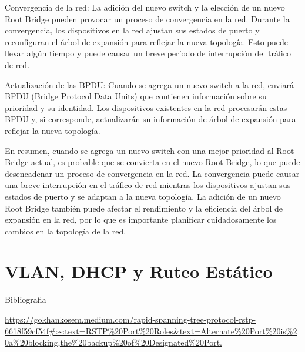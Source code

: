 \documentclass[a4paper]{article}
\begin{document}
\begin{enumerate}
Convergencia de la red: La adición del nuevo switch y la elección de un nuevo Root Bridge pueden provocar un proceso de convergencia en la red. Durante la convergencia, los dispositivos en la red ajustan sus estados de puerto y reconfiguran el árbol de expansión para reflejar la nueva topología. Esto puede llevar algún tiempo y puede causar un breve período de interrupción del tráfico de red.

Actualización de las BPDU: Cuando se agrega un nuevo switch a la red, enviará BPDU (Bridge Protocol Data Units) que contienen información sobre su prioridad y su identidad. Los dispositivos existentes en la red procesarán estas BPDU y, si corresponde, actualizarán su información de árbol de expansión para reflejar la nueva topología.

En resumen, cuando se agrega un nuevo switch con una mejor prioridad al Root Bridge actual, es probable que se convierta en el nuevo Root Bridge, lo que puede desencadenar un proceso de convergencia en la red. La convergencia puede causar una breve interrupción en el tráfico de red mientras los dispositivos ajustan sus estados de puerto y se adaptan a la nueva topología. La adición de un nuevo Root Bridge también puede afectar el rendimiento y la eficiencia del árbol de expansión en la red, por lo que es importante planificar cuidadosamente los cambios en la topología de la red.
\end{enumerate}
\section*{VLAN, DHCP y Ruteo Estático}
Bibliografia

\url{https://gokhankosem.medium.com/rapid-spanning-tree-protocol-rstp-6618f59cf54f#:~:text=RSTP%20Port%20Roles&text=Alternate%20Port%20is%20a%20blocking,the%20backup%20of%20Designated%20Port.}
\end{document}
